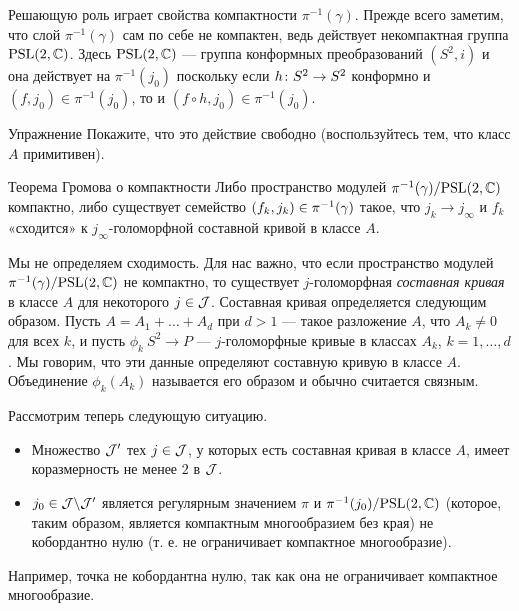 Решающую роль играет свойства компактности $\pi^{-1} (\gamma)$.
Прежде всего заметим, что слой $\pi^{-1} (\gamma)$ сам по себе не компактен, ведь действует некомпактная группа $\mathrm{PSL}(2, \mathbb{C})$.
Здесь $\mathrm{PSL}(2, \mathbb{C})$ — группа конформных преобразований $(S^2, i)$ и она действует на $\pi^{-1} (j_0)$ поскольку
если $h\: S^2 \z\to S^2$ конформно и $(f, j_0) \in \pi^{-1} (j_0)$, то и $(f \circ h, j_0) \in \pi^{-1} (j_0)$.

\begin{ex*}{Упражнение}
Покажите, что это действие свободно (воспользуйтесь тем, что класс $A$ примитивен).
\end{ex*}

\begin{thm*}{Теорема Громова о компактности}
Либо пространство модулей $\pi^{-1} (\gamma)/\mathrm{PSL}(2, \mathbb{C})$ компактно, либо существует семейство $(f_k, j_k) \z\in \pi^{-1} (\gamma)$ такое, что $j_k \to j_\infty$ и $f_k$ «сходится» к $j_\infty$-голоморфной составной кривой в классе $A$.
\end{thm*}

Мы не определяем сходимость.
Для нас важно, что если пространство модулей $\pi^{-1} (\gamma)/\mathrm{PSL}(2, \mathbb{C})$ не компактно, то существует $j$-голоморфная \emph{составная кривая} в классе $A$ для некоторого $j \in \mathcal{J}$.
Составная кривая определяется следующим образом.
Пусть $A = A_1 +\dots+ A_d$ при $d > 1$ — такое разложение $A$, что $A_k \ne 0$ для всех $k$, и пусть $\phi_k \: S^2 \to P$ — $j$-голоморфные кривые в классах $A_k$, $k = 1,\dots,d$.
Мы говорим, что эти данные определяют составную кривую в классе $A$.
Объединение $\phi_k (A_k)$ называется его образом и обычно считается связным.

Рассмотрим теперь следующую ситуацию.
\begin{itemize}
\item Множество $\mathcal{J}'$ тех $j \in \mathcal{J}$, у которых есть составная кривая в классе $A$, имеет коразмерность не менее $2$ в $\mathcal{J}$.

\item $j_0 \in \mathcal{J}\backslash \mathcal{J}'$ является регулярным значением $\pi$ и $\pi^{-1} (j_0)/\mathrm{PSL}(2, \mathbb{C})$ (которое, таким образом, является компактным многообразием без края) не кобордантно нулю (т. е. не ограничивает компактное многообразие).
 
\end{itemize}
Например, точка не кобордантна нулю, так как она не ограничивает компактное многообразие.

